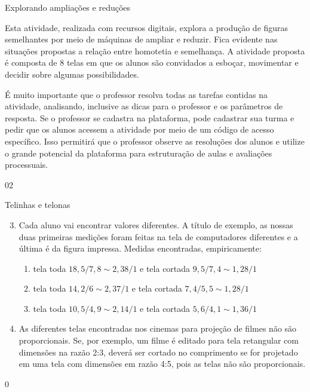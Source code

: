 \begin{sugestions}{Explorando ampliações e reduções}
{Esta atividade, realizada com recursos digitais, explora a produção de figuras semelhantes por meio de máquinas de ampliar e reduzir. Fica evidente nas situações propostas a relação entre homotetia e semelhança.
A atividade proposta é composta de 8 telas em que os alunos são convidados a esboçar, movimentar e decidir sobre algumas possibilidades.

É muito importante que o professor resolva todas as tarefas contidas na atividade, analisando, inclusive as dicas para o professor e os parâmetros de resposta. Se o professor se cadastra na plataforma, pode cadastrar sua turma e pedir que os alunos acessem a atividade por meio de um código de acesso específico. Isso permitirá que o professor observe as resoluções dos alunos e utilize o grande potencial da plataforma para estruturação de aulas e avaliações processuais.}
{0}{2}
\end{sugestions}
\begin{answer}{Telinhas e telonas}
{
\begin{enumerate}\setcounter{enumi}{2}
\item Cada aluno vai encontrar valores diferentes. A título de exemplo, as nossas duas primeiras medições foram feitas na tela de computadores diferentes e a última é da figura impressa. Medidas encontradas, empiricamente: 
\begin{enumerate}
\item tela toda $18{,}5/7{,}8\sim2{,}38/1$ e tela cortada $9{,}5/7{,}4\sim1{,}28/1$
\item tela toda $14{,}2/6\sim2{,}37/1$ e tela cortada $7{,}4/5{,}5\sim1{,}28/1$
\item tela toda $10{,}5/4{,}9\sim2{,}14/1$ e tela cortada $5{,}6/4{,}1\sim1{,}36/1$
\end{enumerate}
\item As diferentes telas encontradas nos cinemas para projeção de filmes não são proporcionais. Se, por exemplo, um filme é editado para tela retangular com dimensões na razão 2:3, deverá ser cortado no comprimento se for projetado em uma tela com dimensões em razão 4:5, pois as telas não são proporcionais.
\end{enumerate}
}{0}
\end{answer}
